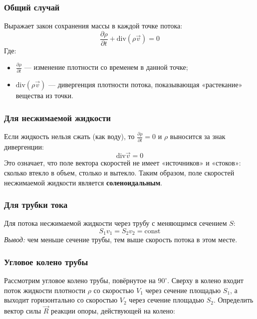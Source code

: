 \subsubsection{Общий случай}
Выражает закон сохранения массы в каждой точке потока:
\[
\frac{\partial \rho}{\partial t} + \text{div}(\rho \vec{v}) = 0
\]
Где:
\begin{itemize}
    \item $\frac{\partial \rho}{\partial t}$ --- изменение плотности со временем в данной точке;
    \item $\text{div}(\rho \vec{v})$ --- дивергенция плотности потока, показывающая «растекание» вещества из точки.
\end{itemize}

\subsubsection{Для несжимаемой жидкости}
Если жидкость нельзя сжать (как воду), то $\frac{\partial \rho}{\partial t} = 0$ и $\rho$ выносится за знак дивергенции:
\[
\text{div} \vec{v} = 0
\]
Это означает, что поле вектора скоростей не имеет «источников» и «стоков»: сколько втекло в объем, столько и вытекло. Таким образом, поле скоростей несжимаемой жидкости является \textbf{соленоидальным}.

\subsubsection{Для трубки тока}
Для потока несжимаемой жидкости через трубу с меняющимся сечением $S$:
\[
S_1 v_1 = S_2 v_2 = \text{const}
\]
\textit{Вывод:} чем меньше сечение трубы, тем выше скорость потока в этом месте.

\subsubsection{Угловое колено трубы}

Рассмотрим угловое колено трубы, повёрнутое на $90^\circ$. 
Сверху в колено входит поток жидкости плотности \( \rho \) со скоростью $V_1$ через сечение площадью $S_1$, 
а выходит горизонтально со скоростью $V_2$ через сечение площадью $S_2$. 
Определить вектор силы $\vec{R}$ реакции опоры, действующей на колено:

